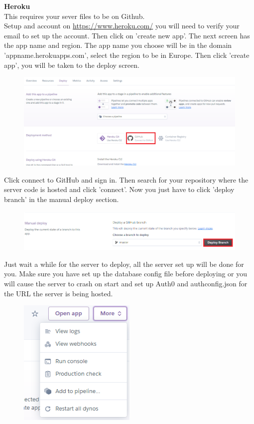 \documentclass[12pt]{article}
\begin{document}
\noindent
\textbf{Heroku}\\
\noindent
This requires your sever files to be on Github.\\

\noindent
Setup and account on \href{https://www.heroku.com/}{https://www.heroku.com/} you will need to verify your email to set up the account. Then click on 'create new app'. The next screen has the app name and region. The app name you choose will be in the domain 'appname.herokuapps.com', select the region to be in Europe. Then click 'create app', you will be taken to the deploy screen.
\begin{figure}[H]
    \centering
    \includegraphics[width=1\textwidth]{deploy/deploy.png}
\end{figure}
\noindent
Click connect to GitHub and sign in. Then search for your repository where the server code is hosted and click 'connect'. Now you just have to click 'deploy branch' in the manual deploy section.
\begin{figure}[H]
    \centering
    \includegraphics[width=1\textwidth]{deploy/manual.png}
\noindent
\end{figure}
\noindent
Just wait a while for the server to deploy, all the server set up will be done for you. Make sure you have set up the database config file before deploying or you will cause the server to crash on start and set up Auth0 and auth\textunderscore config.json for the URL the server is being hosted.
\begin{figure}[H]
    \centering
    \includegraphics[width=0.5\textwidth]{deploy/openapp.png}
\end{figure}
\end{document}
